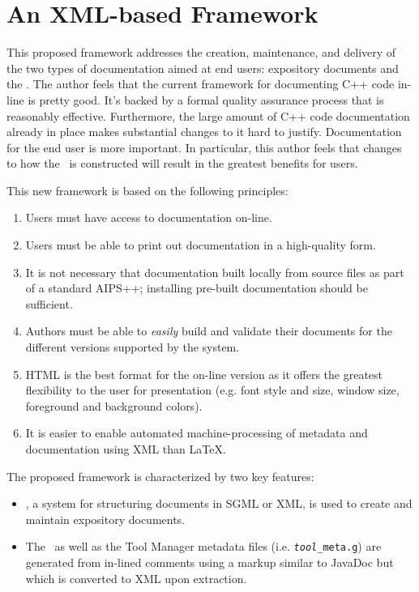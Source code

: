 \section{An XML-based Framework}

This proposed framework addresses the creation, maintenance, and
delivery of the two types of documentation aimed at end users:
expository documents and the .  The author feels that the
current framework for documenting C++ code in-line is pretty good.
It's backed by a formal quality assurance process that is reasonably
effective.  Furthermore, the large amount of C++ code documentation
already in place makes substantial changes to it hard to justify.
Documentation for the end user is more important.  In particular, this
author feels that changes to how the \ is constructed will
result in the greatest benefits for users.

This new framework is based on the following principles:

\begin{enumerate}
\item Users must have access to documentation on-line.
\item Users must be able to print out documentation in a high-quality
form.
\item It is not necessary that documentation built locally from source
files as part of a standard AIPS++; installing pre-built documentation
should be sufficient.
\item Authors must be able to {\it easily} build and validate their
documents for the different versions supported by the system.
\item HTML is the best format for the on-line version as it offers the 
greatest flexibility to the user for presentation (e.g. font style and
size, window size, foreground and background colors).  
\item It is easier to enable automated machine-processing of
metadata and documentation using XML than \LaTeX.
\end{enumerate}

The proposed framework is characterized by two key features:

\begin{itemize} 
\item {},
a system for structuring documents in SGML or XML, is used to create
and maintain expository documents. 
\item The \ as well as the Tool Manager metadata files
(i.e. {\tt {\it tool}\_meta.g}) are generated from in-lined comments
using a markup similar to JavaDoc but which is converted to XML upon
extraction.  
\end{itemize}

